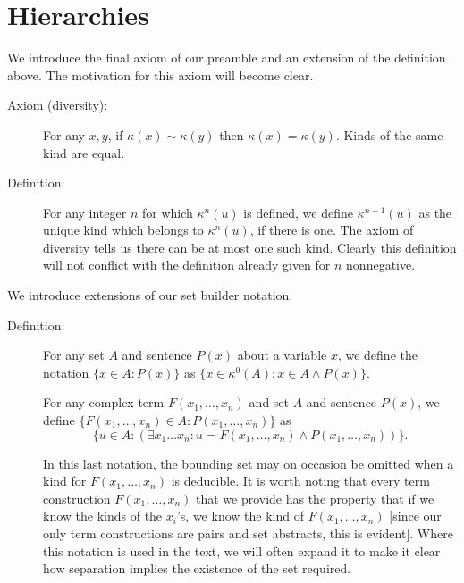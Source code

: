 \documentclass[12pt]{article}
\begin{document}
\newpage

\section{Hierarchies}






We introduce the final axiom of our preamble and an extension of the definition above.  The motivation for this axiom will become clear.

\begin{description}

\item[Axiom (diversity):]  For any $x,y$, if $\kappa(x)\sim \kappa(y)$ then $\kappa(x)=\kappa(y)$.  Kinds of the same kind are equal.

\item[Definition:]  For any integer $n$ for which $\kappa^n(u)$ is defined, we define $\kappa^{n-1}(u)$
as the unique kind which belongs to $\kappa^n(u)$, if there is one.  The axiom of diversity tells us there can be at most one such kind.  Clearly this definition will not conflict with the definition already given for $n$ nonnegative.

\end{description}

We introduce extensions of our set builder notation.

\begin{description}

\item[Definition:] For any set $A$ and sentence $P(x)$ about a variable $x$, we define the notation $\{x \in A:P(x)\}$ as $\{x \in \kappa^0(A):x \in A \wedge P(x)\}$.

For any complex term $F(x_1,\ldots,x_n)$ and set $A$ and sentence $P(x)$, we define
$\{F(x_1,\ldots,x_n) \in A:P(x_1,\ldots,x_n)\}$ as $$\{u \in A:(\exists x_1\ldots x_n:u = F(x_1,\ldots,x_n) \wedge P(x_1,\ldots,x_n))\}.$$

In this last notation, the bounding set may on occasion be omitted when a kind for $F(x_1,\ldots,x_n)$  is deducible.   It is worth noting that every term construction $F(x_1,\ldots,x_n)$ that we provide has the property that if we know the kinds of the $x_i$'s, we know the kind of  $F(x_1,\ldots,x_n)$ [since our only term constructions are pairs and set abstracts, this is evident].  Where this notation is used in the text, we will often expand it to make it clear how separation implies the existence of the set required.

\end{description}
\end{document}
